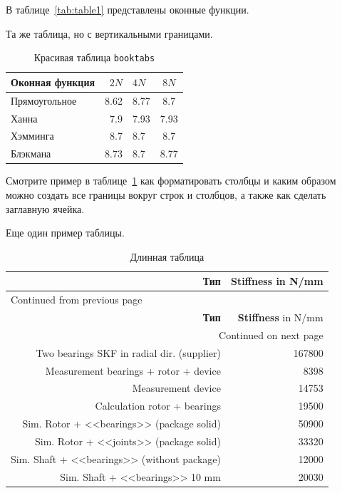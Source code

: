 \documentclass[12pt]{extarticle}
\begin{document}
В таблице~\ref{tab:table1} представлены оконные функции.

Та же таблица, но с вертикальными границами.

\begin{table}[htbp]
\caption{\label{tab:table2}Красивая таблица \texttt{booktabs}}
\centering
\begin{tabular}{|l|r|l|c|}
\toprule
\textbf{Оконная функция} & \textbf{\(2N\)} & \textbf{\(4N\)} & \textbf{\(8N\)}\\
\midrule
Прямоугольное & 8.62 & 8.77 & 8.7\\
Ханна & 7.9 & 7.93 & 7.93\\
Хэмминга & 8.7 & 8.7 & 8.7\\
Блэкмана & 8.73 & 8.7 & 8.77\\
\bottomrule
\end{tabular}
\end{table}

Смотрите пример в таблице~\ref{tab:table2} как форматировать столбцы и каким образом можно создать все границы вокруг строк и столбцов, а также как сделать заглавную ячейка.

Еще один пример таблицы.
\begin{longtable}{@{}rr@{}}
\caption{\label{tab:longtable1}Длинная таблица}
\\
\toprule
\textbf{Тип} & \textbf{Stiffness} in N/mm\\
\midrule
\endfirsthead
\multicolumn{2}{l}{Continued from previous page} \\
\toprule

\textbf{Тип} & \textbf{Stiffness} in N/mm \\

\midrule
\endhead
\midrule\multicolumn{2}{r}{Continued on next page} \\
\endfoot
\endlastfoot
Two bearings SKF in radial dir. (supplier) & 167800\\
Measurement bearings + rotor + device & 8398\\
Measurement device & 14753\\
Calculation rotor + bearings & 19500\\
\midrule
Sim. Rotor + {}<<bearings>>{} (package solid) & 50900\\
Sim. Rotor + {}<<joints>>{} (package solid) & 33320\\
Sim. Shaft + {}<<bearings>>{} (without package) & 12000\\
Sim. Shaft + {}<<bearings>>{} 10 mm & 20030\\
\bottomrule
\end{longtable}
\end{document}
